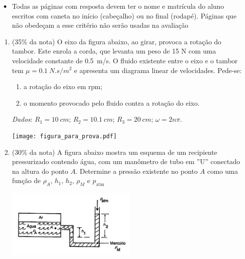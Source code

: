 \documentclass[12pt,a4paper,brazilian, fleqn]{article}
\newcommand{\ratio}[1]{(#1\% da nota)}
\begin{document}
\begin{tcolorbox}[colback=black!10, colframe=black!50, title=Observações]
    \begin{itemize}
        \item Todas as páginas com resposta devem ter o nome e matrícula do
            aluno escritos com caneta no início (cabeçalho) ou no final
            (rodapé). Páginas que não obedeçam a esse critério não serão usadas
            na avaliação
    \end{itemize}
\end{tcolorbox}

\vspace{2em}

\begin{enumerate}
    \item \ratio{35} O eixo da figura abaixo, ao girar, provoca a rotação do tambor.
        Este enrola a corda, que levanta um peso de 15 N com uma velocidade constante
        de \SI{0.5}{m/s}. O fluido existente entre o eixo e o tambor tem
        \(\mu = \SI{0.1}{N.s/m^2}\) e apresenta um diagrama linear de velocidades.
        Pede-se:
        \begin{enumerate}
            \item a rotação do eixo em rpm;
            \item o momento provocado pelo fluido contra a rotação do eixo.
        \end{enumerate}
        \textit{Dados}: \(R_1 = \SI{10}{cm}\); \(R_2 = \SI{10.1}{cm}\);
        \(R_3 = \SI{20}{cm}\); \(\omega = 2 n \pi\).

        \begin{center}
            \texttt{[image: figura\_para\_prova.pdf]}
        \end{center}

        \newpage

    \item \ratio{30} A figura abaixo mostra um esquema de um recipiente pressurizado
        contendo água, com um manômetro de tubo em ''U'' conectado na altura do 
        ponto \(A\). Determine a pressão existente no ponto \(A\) como uma função
        de \(\rho_A\), \(h_1\), \(h_2\), \(\rho_M\) e \(p_\text{atm}\)

        \begin{center}
            \includegraphics[width=0.5\textwidth]{Captura de tela 2025-06-03 133507.png}
        \end{center}


\end{enumerate}
\end{document}

